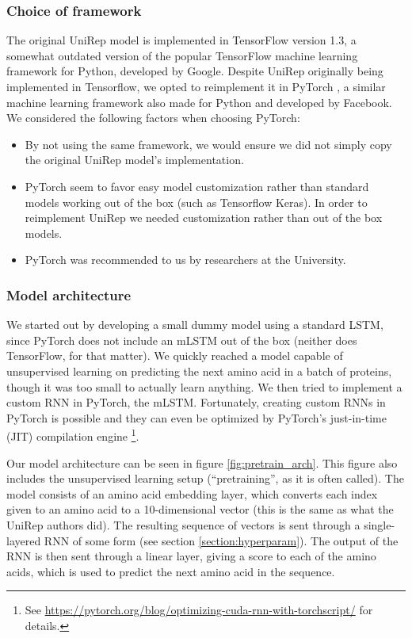 \documentclass[a4paper,12pt]{article}
\begin{document}
\subsubsection{Choice of framework}
The original UniRep model is implemented in TensorFlow version 1.3, a somewhat outdated version of the popular TensorFlow machine learning framework for Python, developed by Google. Despite UniRep originally being implemented in Tensorflow, we opted to reimplement it in PyTorch \cite{NEURIPS2019_9015}, a similar machine learning framework also made for Python and developed by Facebook. We considered the following factors when choosing PyTorch:
\begin{itemize}
    \item By not using the same framework, we would ensure we did not simply copy the original UniRep model's implementation.
    \item PyTorch seem to favor easy model customization rather than standard models working out of the box (such as Tensorflow Keras). In order to reimplement UniRep we needed customization rather than out of the box models.  
    \item PyTorch was recommended to us by researchers at the University.
\end{itemize}

\subsubsection{Model architecture}
\label{section:reproduction_architecture}
We started out by developing a small dummy model using a standard LSTM, since PyTorch does not include an mLSTM out of the box (neither does TensorFlow, for that matter). We quickly reached a model capable of unsupervised learning on predicting the next amino acid in a batch of proteins, though it was too small to actually learn anything. We then tried to implement a custom RNN in PyTorch, the mLSTM. Fortunately, creating custom RNNs in PyTorch is possible and they can even be optimized by PyTorch's just-in-time (JIT) compilation engine \footnote{See \url{https://pytorch.org/blog/optimizing-cuda-rnn-with-torchscript/} for details.}.

Our model architecture can be seen in figure \ref{fig:pretrain_arch}. This figure also includes the unsupervised learning setup (``pretraining'', as it is often called). The model consists of an amino acid embedding layer, which converts each index given to an amino acid to a 10-dimensional vector (this is the same as what the UniRep authors did). The resulting sequence of vectors is sent through a single-layered RNN of some form (see section \ref{section:hyperparam}). The output of the RNN is then sent through a linear layer, giving a score to each of the amino acids, which is used to predict the next amino acid in the sequence.
\end{document}
